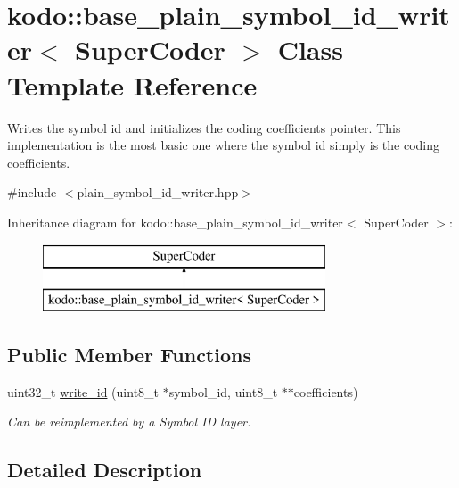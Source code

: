 \hypertarget{classkodo_1_1base__plain__symbol__id__writer}{\section{kodo\-:\-:base\-\_\-plain\-\_\-symbol\-\_\-id\-\_\-writer$<$ Super\-Coder $>$ Class Template Reference}
\label{classkodo_1_1base__plain__symbol__id__writer}
}


Writes the symbol id and initializes the coding coefficients pointer. This implementation is the most basic one where the symbol id simply is the coding coefficients.  




{\ttfamily \#include $<$plain\-\_\-symbol\-\_\-id\-\_\-writer.\-hpp$>$}

Inheritance diagram for kodo\-:\-:base\-\_\-plain\-\_\-symbol\-\_\-id\-\_\-writer$<$ Super\-Coder $>$\-:\begin{figure}[H]
\begin{center}
\leavevmode
\includegraphics[height=2.000000cm]{classkodo_1_1base__plain__symbol__id__writer}
\end{center}
\end{figure}
\subsection*{Public Member Functions}
\begin{DoxyCompactItemize}
\item 
uint32\-\_\-t \hyperlink{classkodo_1_1base__plain__symbol__id__writer_a0cd4786a0a2aecc0f6262fc3721f35fb}{write\-\_\-id} (uint8\-\_\-t $\ast$symbol\-\_\-id, uint8\-\_\-t $\ast$$\ast$coefficients)
\begin{DoxyCompactList}\small\item\em Can be reimplemented by a Symbol I\-D layer. \end{DoxyCompactList}\end{DoxyCompactItemize}


\subsection{Detailed Description}
